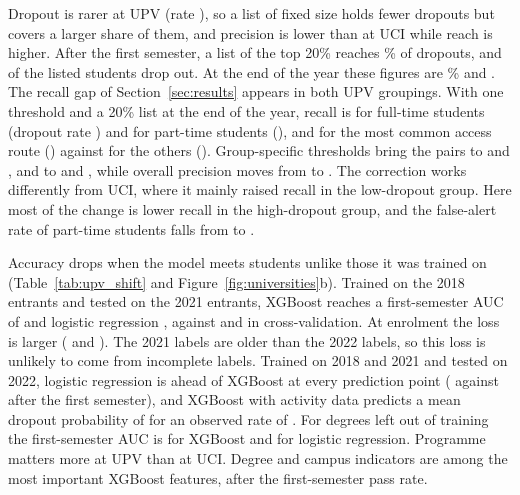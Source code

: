 \documentclass[11pt,a4paper]{article}
\begin{document}
Dropout is rarer at UPV (rate \upvRate), so a list of fixed size holds fewer dropouts but covers a larger share of them, and precision is lower than at UCI while reach is higher. After the first semester, a list of the top 20\% reaches \upvSemoneXgbTopTwentyRPct\% of dropouts, and \upvSemoneXgbTopTwentyP{} of the listed students drop out. At the end of the year these figures are \upvYearXgbTopTwentyRPct\% and \upvYearXgbTopTwentyP. The recall gap of Section~\ref{sec:results} appears in both UPV groupings. With one threshold and a 20\% list at the end of the year, recall is \upvThrYearFulltimeSingleRec{} for full-time students (dropout rate \upvThrFulltimeRate) and \upvThrYearParttimeSingleRec{} for part-time students (\upvThrParttimeRate), and \upvThrYearStandardaccessSingleRec{} for the most common access route (\upvThrStandardaccessRate) against \upvThrYearOtheraccessroutesSingleRec{} for the others (\upvThrOtheraccessroutesRate). Group-specific thresholds bring the pairs to \upvThrYearFulltimeGroupRec{} and \upvThrYearParttimeGroupRec, and to \upvThrYearStandardaccessGroupRec{} and \upvThrYearOtheraccessroutesGroupRec, while overall precision moves from \upvThrYearStudymodeSinglePrec{} to \upvThrYearStudymodeGroupPrec. The correction works differently from UCI, where it mainly raised recall in the low-dropout group. Here most of the change is lower recall in the high-dropout group, and the false-alert rate of part-time students falls from \upvThrYearParttimeSingleFpr{} to \upvThrYearParttimeGroupFpr.





Accuracy drops when the model meets students unlike those it was trained on (Table~\ref{tab:upv_shift} and Figure~\ref{fig:universities}b). Trained on the 2018 entrants and tested on the 2021 entrants, XGBoost reaches a first-semester AUC of \upvTaSemoneXgbAuc{} and logistic regression \upvTaSemoneLrAuc, against \upvSemoneXgbAuc{} and \upvSemoneLrAuc{} in cross-validation. At enrolment the loss is larger (\upvTaEnrolXgbAuc{} and \upvTaEnrolLrAuc). The 2021 labels are older than the 2022 labels, so this loss is unlikely to come from incomplete labels. Trained on 2018 and 2021 and tested on 2022, logistic regression is ahead of XGBoost at every prediction point (\upvTbSemoneLrAuc{} against \upvTbSemoneXgbAuc{} after the first semester), and XGBoost with activity data predicts a mean dropout probability of \upvTbSemonelmsXgbPred{} for an observed rate of \upvTbSemonelmsObs. For degrees left out of training the first-semester AUC is \upvGdSemoneXgbAuc{} for XGBoost and \upvGdSemoneLrAuc{} for logistic regression. Programme matters more at UPV than at UCI. Degree and campus indicators are among the most important XGBoost features, after the first-semester pass rate.
\end{document}
